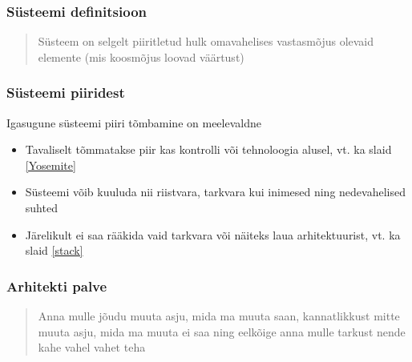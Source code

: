 \begin{frame}[fragile]
  \frametitle{Süsteemi definitsioon}
		\begin{center}
  			\begin{quote}
				Süsteem on selgelt piiritletud hulk omavahelises vastasmõjus olevaid elemente (mis koosmõjus loovad väärtust)
			\end{quote}
		\end{center}
\end{frame}

\begin{frame}[fragile]
  \frametitle{Süsteemi piiridest}
		Igasugune süsteemi piiri tõmbamine on meelevaldne
		\begin{itemize}
			\item Tavaliselt tõmmatakse piir kas kontrolli või tehnoloogia alusel, vt. ka slaid \ref{Yosemite}
			\item Süsteemi võib kuuluda nii riistvara, tarkvara kui inimesed ning nedevahelised suhted
			\item Järelikult ei saa rääkida vaid tarkvara või näiteks laua arhitektuurist, vt. ka slaid \ref{stack}
		\end{itemize}

\end{frame}

\begin{frame}[fragile]
  \frametitle{Arhitekti palve}
		\begin{center}
  			\begin{quote}
				Anna mulle jõudu muuta asju, mida ma muuta saan, kannatlikkust mitte muuta asju, mida ma muuta ei saa ning eelkõige anna mulle tarkust nende kahe vahel vahet teha
			\end{quote}
		\end{center}
\end{frame}

